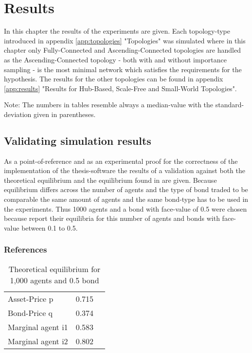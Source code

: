 \documentclass[Bachelorarbeit.tex]{subfiles}
\begin{document}
\graphicspath{{./figures/results/}}	%

\chapter{Results}
\label{ch:results}

In this chapter the results of the experiments are given. Each topology-type introduced in appendix \ref{app:topologies} "Topologies" was simulated where in this chapter only Fully-Connected and Ascending-Connected topologies are handled as the Ascending-Connected topology - both with and without importance sampling - is the most minimal network which satisfies the requirements for the hypothesis. The results for the other topologies can be found in appendix \ref{app:results} "Results for Hub-Based, Scale-Free and Small-World Topologies".

Note: The numbers in tables resemble always a median-value with the standard-deviation given in parentheses.

\section{Validating simulation results}
As  a point-of-reference and as an experimental proof for the correctness of the implementation of the thesis-software the results of a validation against both the theoretical equilibrium and the equilibrium found in \cite{Breuer2015} are given. Because equilibrium differs across the number of agents and the type of bond traded to be comparable the same amount of agents and the same bond-type has to be used in the experiments. Thus 1000 agents and a bond with face-value of 0.5 were chosen because \cite{Breuer2015} report their equilibria for this number of agents and bonds with face-value between 0.1 to 0.5.

\subsection{References}

\begin{table}[H]
	\centering
	\caption{Theoretical equilibrium for 1,000 agents and 0.5 bond}
	\begin{tabular} { l c r }
		\hline
		Asset-Price p & 0.715 \\
		Bond-Price q & 0.374 \\
		Marginal agent i1 & 0.583 \\
		Marginal agent i2 & 0.802 \\
		\hline
	\end{tabular}
	\label{tab:equilibrium_THEORY_1000}
\end{table}
\end{document}
